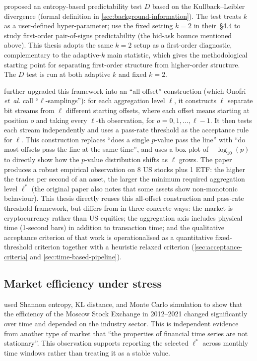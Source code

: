 \documentclass[11pt,titlepage,openany,oneside]{book}  %
\newcommand{\etal}{\emph{et~al.}}
\begin{document}
\citet{shternshis2025predictability} proposed an entropy-based predictability test $D$ based on the Kullback--Leibler divergence (formal definition in \cref{sec:background-information}). The test treats $k$ as a user-defined hyper-parameter; \citet{shternshis2025predictability} use the fixed setting $k = 2$ in their~\S4.4 to study first-order pair-of-signs predictability (the bid-ask bounce mentioned above). This thesis adopts the same $k = 2$ setup as a first-order diagnostic, complementary to the adaptive-$k$ main statistic, which gives the methodological starting point for separating first-order structure from higher-order structure. The $D$ test is run at both adaptive $k$ and fixed $k = 2$.

\citet{onofri2025emergence} further upgraded this framework into an ``all-offset'' construction (which Onofri \etal{} call ``$\ell$-samplings''): for each aggregation level $\ell$, it constructs $\ell$ separate bit streams from $\ell$ different starting offsets, where each offset means starting at position $o$ and taking every $\ell$-th observation, for $o = 0,1,\ldots,\ell-1$. It then tests each stream independently and uses a pass-rate threshold as the acceptance rule for $\ell$. This construction replaces ``does a single $p$-value pass the line'' with ``do most offsets pass the line at the same time'', and uses a box plot of $-\log_{10}(p)$ to directly show how the $p$-value distribution shifts as $\ell$ grows. The paper produces a robust empirical observation on 8 US stocks plus 1 ETF: the higher the trades per second of an asset, the larger the minimum required aggregation level $\ell^*$ (the original paper also notes that some assets show non-monotonic behaviour). This thesis directly reuses this all-offset construction and pass-rate threshold framework, but differs from \citet{onofri2025emergence} in three concrete ways: the market is cryptocurrency rather than US equities; the aggregation axis includes physical time (1-second bars) in addition to transaction time; and the qualitative acceptance criterion of that work is operationalised as a quantitative fixed-threshold criterion together with a heuristic relaxed criterion (\cref{sec:acceptance-criteria} and \cref{sec:time-based-pipeline}).

\subsection*{Market efficiency under stress}

\citet{shternshis2022moscow} used Shannon entropy, KL distance, and Monte Carlo simulation to show that the efficiency of the Moscow Stock Exchange in 2012--2021 changed significantly over time and depended on the industry sector. This is independent evidence from another type of market that ``the properties of financial time series are not stationary''. This observation supports reporting the selected $\ell^*$ across monthly time windows rather than treating it as a stable value.
\end{document}
